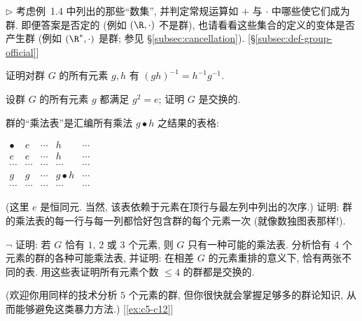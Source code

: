 \begin{prob}
\label{ex:number-sets-groups}
$\triangleright$ 考虑例~1.4 中列出的那些``数集'', 并判定常规运算如 $+$ 与 $\cdot$ 中哪些使它们成为群. 即便答案是否定的 (例如 $(\R, \cdot)$ 不是群), 也请看看这些集合的定义的变体是否产生群 (例如 $(\R^{*}, \cdot)$ 是群; 参见 \S\ref{subsec:cancellation}). [\S\ref{subsec:def-group-official}]
\end{prob}

\begin{prob}
\label{ex:inverse-product}
证明对群 $G$ 的所有元素 $g, h$ 有 $(gh)^{-1} = h^{-1} g^{-1}$.
\end{prob}

\begin{prob}
\label{ex:square-identity}
设群 $G$ 的所有元素 $g$ 都满足 $g^2 = e$; 证明 $G$ 是交换的.
\end{prob}

\begin{prob}
\label{ex:multiplication-table}
群的``乘法表''是汇编所有乘法 $g \bullet h$ 之结果的表格:
\begin{center}
\renewcommand{\arraystretch}{1.2}
$\begin{array}{c|cccc}
\bullet & e & \cdots & h & \cdots \\ \hline
e & e & \cdots & h & \cdots \\
\cdots & \cdots & \cdots & \cdots & \cdots \\
g & g & \cdots & g \bullet h & \cdots \\
\cdots & \cdots & \cdots & \cdots & \cdots
\end{array}$
\end{center}
(这里 $e$ 是恒同元. 当然, 该表依赖于元素在顶行与最左列中列出的次序.) 证明: 群的乘法表的每一行与每一列都恰好包含群的每个元素一次 (就像数独图表那样!).
\end{prob}

\begin{prob}
\label{ex:small-groups-tables}
$\neg$ 证明: 若 $G$ 恰有 $1$, $2$ 或 $3$ 个元素, 则 $G$ 只有一种可能的乘法表. 分析恰有 $4$ 个元素的群的各种可能乘法表, 并证明: 在相差 $G$ 的元素重排的意义下, 恰有两张不同的表. 用这些表证明所有元素个数 $\leq 4$ 的群都是交换的.

(欢迎你用同样的技术分析 $5$ 个元素的群, 但你很快就会掌握足够多的群论知识, 从而能够避免这类暴力方法.) [\ref{ex:c5-c12}]
\end{prob}

